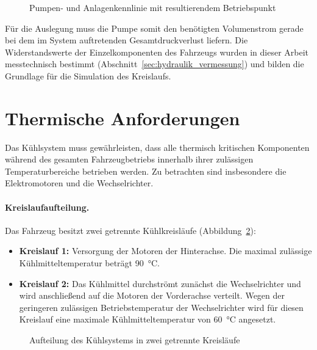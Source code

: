 \begin{figure}[htb]
  \centering
  \caption{Pumpen- und Anlagenkennlinie mit resultierendem Betriebspunkt}
  \label{fig:pumpe_anlage}
\end{figure}

Für die Auslegung muss die Pumpe somit den benötigten Volumenstrom gerade bei
dem im System auftretenden Gesamtdruckverlust liefern. Die Widerstandswerte der
Einzelkomponenten des Fahrzeugs wurden in dieser Arbeit messtechnisch bestimmt
(Abschnitt~\ref{sec:hydraulik_vermessung}) und bilden die Grundlage für die
Simulation des Kreislaufs.

\section{Thermische Anforderungen}
\label{sec:thermische_anforderungen}

Das Kühlsystem muss gewährleisten, dass alle thermisch kritischen Komponenten
während des gesamten Fahrzeugbetriebs innerhalb ihrer zulässigen
Temperaturbereiche betrieben werden. Zu betrachten sind insbesondere die
Elektromotoren und die Wechselrichter.

\paragraph{Kreislaufaufteilung.}
Das Fahrzeug besitzt zwei getrennte Kühlkreisläufe
(Abbildung~\ref{fig:kreislaufaufteilung}):
\begin{itemize}
  \item \textbf{Kreislauf 1:} Versorgung der Motoren der Hinterachse.
        Die maximal zulässige Kühlmitteltemperatur beträgt \SI{90}{\celsius}.
  \item \textbf{Kreislauf 2:} Das Kühlmittel durchströmt zunächst die
        Wechselrichter und wird anschließend auf die Motoren der Vorderachse
        verteilt. Wegen der geringeren zulässigen Betriebstemperatur der
        Wechselrichter wird für diesen Kreislauf eine maximale
        Kühlmitteltemperatur von \SI{60}{\celsius} angesetzt.
\end{itemize}

\begin{figure}[htb]
  \centering
  \caption{Aufteilung des Kühlsystems in zwei getrennte Kreisläufe}
  \label{fig:kreislaufaufteilung}
\end{figure}

